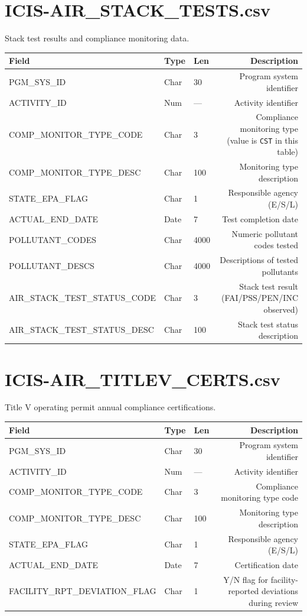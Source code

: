 \documentclass[11pt]{article}
\begin{document}
\section*{ICIS-AIR\_STACK\_TESTS.csv}
Stack test results and compliance monitoring data.
\begin{longtable}{F T L D}
\toprule
Field & Type & Len & Description \\ \midrule \endhead
PGM\_SYS\_ID & Char & 30 & Program system identifier \\
ACTIVITY\_ID & Num & --- & Activity identifier \\
COMP\_MONITOR\_TYPE\_CODE & Char & 3 & Compliance monitoring type (value is \texttt{CST} in this table) \\
COMP\_MONITOR\_TYPE\_DESC & Char & 100 & Monitoring type description \\
STATE\_EPA\_FLAG & Char & 1 & Responsible agency (E/S/L) \\
ACTUAL\_END\_DATE & Date & 7 & Test completion date \\
POLLUTANT\_CODES & Char & 4000 & Numeric pollutant codes tested \\
POLLUTANT\_DESCS & Char & 4000 & Descriptions of tested pollutants \\
AIR\_STACK\_TEST\_STATUS\_CODE & Char & 3 & Stack test result (FAI/PSS/PEN/INC observed) \\
AIR\_STACK\_TEST\_STATUS\_DESC & Char & 100 & Stack test status description \\
\bottomrule
\end{longtable}

\section*{ICIS-AIR\_TITLEV\_CERTS.csv}
Title V operating permit annual compliance certifications.
\begin{longtable}{F T L D}
\toprule
Field & Type & Len & Description \\ \midrule \endhead
PGM\_SYS\_ID & Char & 30 & Program system identifier \\
ACTIVITY\_ID & Num & --- & Activity identifier \\
COMP\_MONITOR\_TYPE\_CODE & Char & 3 & Compliance monitoring type code \\
COMP\_MONITOR\_TYPE\_DESC & Char & 100 & Monitoring type description \\
STATE\_EPA\_FLAG & Char & 1 & Responsible agency (E/S/L) \\
ACTUAL\_END\_DATE & Date & 7 & Certification date \\
FACILITY\_RPT\_DEVIATION\_FLAG & Char & 1 & Y/N flag for facility-reported deviations during review \\
\bottomrule
\end{longtable}
\end{document}
